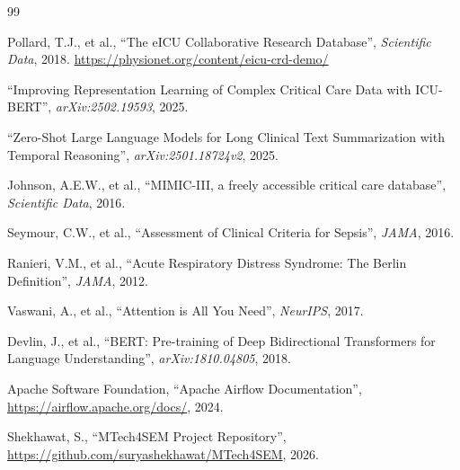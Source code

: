 \documentclass[12pt]{report}
\begin{document}
\newpage

\begin{thebibliography}{99}

 Pollard, T.J., et al., ``The eICU Collaborative Research Database'', \textit{Scientific Data}, 2018. \url{https://physionet.org/content/eicu-crd-demo/}

 ``Improving Representation Learning of Complex Critical Care Data with ICU-BERT'', \textit{arXiv:2502.19593}, 2025.

 ``Zero-Shot Large Language Models for Long Clinical Text Summarization with Temporal Reasoning'', \textit{arXiv:2501.18724v2}, 2025.

 Johnson, A.E.W., et al., ``MIMIC-III, a freely accessible critical care database'', \textit{Scientific Data}, 2016.

 Seymour, C.W., et al., ``Assessment of Clinical Criteria for Sepsis'', \textit{JAMA}, 2016.

 Ranieri, V.M., et al., ``Acute Respiratory Distress Syndrome: The Berlin Definition'', \textit{JAMA}, 2012.

 Vaswani, A., et al., ``Attention is All You Need'', \textit{NeurIPS}, 2017.

 Devlin, J., et al., ``BERT: Pre-training of Deep Bidirectional Transformers for Language Understanding'', \textit{arXiv:1810.04805}, 2018.

 Apache Software Foundation, ``Apache Airflow Documentation'', \url{https://airflow.apache.org/docs/}, 2024.

 Shekhawat, S., ``MTech4SEM Project Repository'', \url{https://github.com/suryashekhawat/MTech4SEM}, 2026.


\end{thebibliography}
\end{document}
